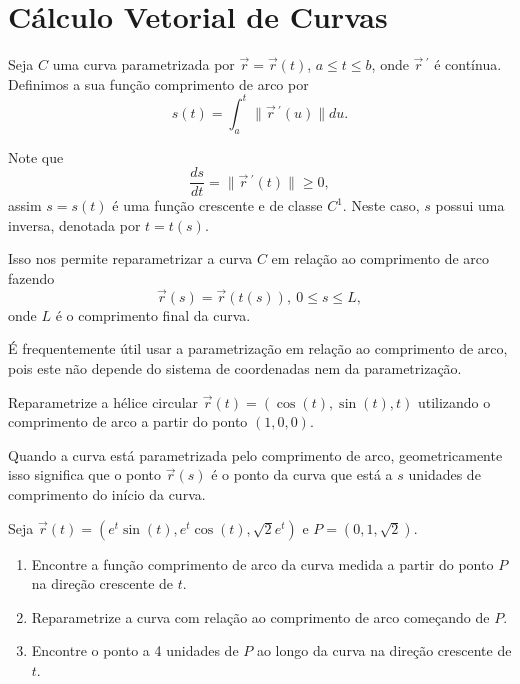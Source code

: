 \section{Cálculo Vetorial de Curvas}



Seja $C$ uma curva parametrizada por $\vec{r}=\vec{r}(t)$, $a\leq t\leq b$, onde $\vec{r}\,^\prime$ é contínua. Definimos a sua {\color{blue} função comprimento de arco} por
\[s(t)=\int_a^t\|\vec{r}\,^\prime (u)\|du.\]

Note que
\[\frac{ds}{dt}=\|\vec{r}\,^\prime (t)\|\geq 0,\]
assim $s=s(t)$ é uma {\color{red}função crescente} e de classe $C^1$. Neste caso, $s$ possui uma inversa, denotada por $t=t(s)$.

\vfill

Isso nos permite {\color{red} reparametrizar a curva $C$ em relação ao comprimento de arco} fazendo
\[\vec{r}(s)=\vec{r}(t(s)),\ 0\leq s\leq L,\]
onde $L$ é o comprimento final da curva.

\begin{caixaazul}{}{}
É frequentemente útil usar a parametrização em relação ao comprimento de arco, pois este não depende do sistema de coordenadas nem da parametrização.
\end{caixaazul}
\newpage


\begin{exeb}{}{}
Reparametrize a hélice circular $\vec{r}(t)=(\cos(t),\sin(t),t)$ utilizando o comprimento de arco a partir do ponto $(1,0,0)$.
\end{exeb}
\vfill

\begin{caixaazul}{}{}
Quando a curva está parametrizada pelo comprimento de arco, geometricamente isso significa que o ponto $\vec{r}(s)$  é o ponto da curva que está a $s$ unidades de comprimento do início da curva.
\end{caixaazul}
\newpage

\begin{casab}{}{}
Seja $\vec{r}(t)=(e^t\sin(t),e^t\cos(t),\sqrt{2}e^t)$ e $P=(0,1,\sqrt{2})$.
\begin{enumerate}
\item Encontre a função comprimento de arco da curva medida a partir do ponto $P$ na direção crescente de $t$.
\item Reparametrize a curva com relação ao comprimento de arco começando de $P$.
\item Encontre o ponto a 4 unidades de $P$ ao longo da curva na direção crescente de $t$.
\end{enumerate}
\end{casab}
\newpage

